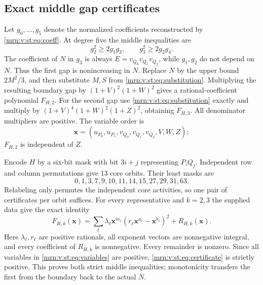 \documentclass[11pt,a4paper]{article}
\theoremstyle{remark}\newtheorem{remark}[theorem]{Remark}
\begin{document}
\subsection{Exact middle gap certificates}
Let $g_0,\ldots,g_5$ denote the normalized coefficients reconstructed by
\eqref{mrn:v:st:eq:coeff}. At degree five the middle inequalities are
\[
 g_2^2\ge2g_1g_3,\qquad g_3^2\ge2g_2g_4.
\]
The coefficient of $N$ in $g_3$ is always
$E=v_{Q_0}v_{Q_1}v_{Q_2}$, while $g_1,g_2$ do not depend on $N$.
Thus the first gap is nonincreasing in $N$. Replace $N$ by the upper bound
$2M^2/3$, and then substitute $M,S$ from \eqref{mrn:v:st:eq:substitution}.
Multiplying the resulting boundary gap by $(1+V)^2(1+W)^2$ gives a
rational-coefficient polynomial $F_{H,2}$.
For the second gap use \eqref{mrn:v:st:eq:substitution} exactly and multiply by
$(1+V)^4(1+W)^2(1+Z)^2$, obtaining $F_{H,3}$.
All denominator multipliers are positive. The variable order is
\begin{equation}\label{mrn:v:st:eq:variables}
 \boldsymbol{x}=(u_{P_0},u_{P_1},v_{Q_0},v_{Q_1},v_{Q_2},V,W,Z);
\end{equation}
$F_{H,2}$ is independent of $Z$.

Encode $H$ by a six-bit mask with bit $3i+j$ representing $P_iQ_j$.
Independent row and column permutations give 13 core orbits. Their least
masks are
\[
 0,1,3,7,9,10,11,14,15,27,29,31,63.
\]
Relabeling only permutes the independent core activities, so one pair of
certificates per orbit suffices. For every representative and $k=2,3$ the
supplied data give the exact identity
\begin{equation}\label{mrn:v:st:eq:certificate}
 F_{H,k}(\boldsymbol{x})=
 \sum_\ell\lambda_\ell\boldsymbol{x}^{m_\ell}
       (r_\ell\boldsymbol{x}^{a_\ell}-\boldsymbol{x}^{b_\ell})^2
       +R_{H,k}(\boldsymbol{x}).
\end{equation}
Here $\lambda_\ell,r_\ell$ are positive rationals, all exponent vectors are
nonnegative integral, and every coefficient of $R_{H,k}$ is nonnegative.
Every remainder is nonzero. Since all variables in \eqref{mrn:v:st:eq:variables}
are positive, \eqref{mrn:v:st:eq:certificate} is strictly positive. This proves both
strict middle inequalities; monotonicity transfers the first from the
boundary back to the actual $N$.
\end{document}
